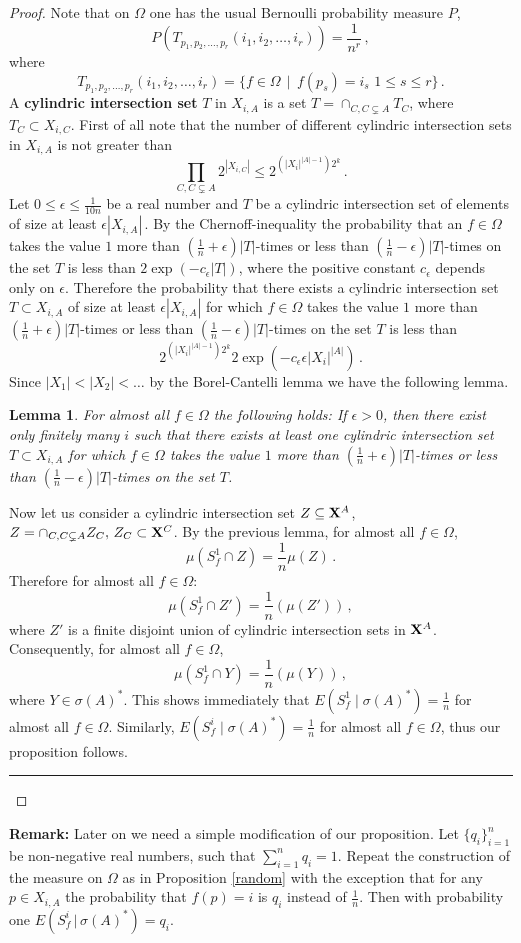 \documentclass [11pt] {article}
\newcommand{\qed} {\hspace {0.1in} \rule {1.5mm} {3.5mm}}
\newtheorem{lemma}{Lemma}[section]
\def\e{\epsilon}
\def\xo{{\bf X}}
\begin{document}
\begin{proof}
\noindent
Note that on $\Omega$ one has the usual Bernoulli probability measure $P$,
$$P(T_{p_1,p_2,\dots,p_r}(i_1,i_2,\dots,i_r))=\frac{1}{n^r}\,,$$
where
$$T_{p_1,p_2,\dots,p_r}(i_1,i_2,\dots,i_r)=\{f\in\Omega\,\mid\, f(p_s)=i_s\,
\,1\leq s \leq r\}\,.$$
A {\bf cylindric intersection set} $T$ in $X_{i,A}$
is a set $T=\cap_{C,C\subsetneq A} T_C$, where  $T_C\subset X_{i,C}$.
First of all note that the number of different cylindric intersection
sets in $X_{i,A}$ is not greater than
$$\prod_{C,C\subsetneq A} 2^{|X_{i,C}|}\leq 2^{(|X_i|^{|A|-1})2^k}\,.$$
Let $0\leq \e \leq\frac{1}{10n}$ be a real number and $T$ be a cylindric
intersection set of elements of size at least $\e |X_{i,A}|\,.$ By the
Chernoff-inequality the probability that an $f\in \Omega$ takes the
value $1$ more than $(\frac{1}{n}+\e)|T|$-times or less than
$(\frac{1}{n}-\e)|T|$-times on the set $T$ is less than
$2\exp(- c_{\e}|T|)$, where the positive constant $c_{\e}$ depends only
on $\e$. Therefore the probability that there exists a cylindric intersection
set $T\subset X_{i,A}$ of size at least $\e |X_{i,A}|$ for which
$f\in \Omega$ takes the
value $1$ more than $(\frac{1}{n}+\e)|T|$-times or less than
$(\frac{1}{n}-\e)|T|$-times on the set $T$ is less than
$$2^{(|X_i|^{|A|-1})2^k} 2 \exp(-c_{\e}\e |X_i|^{|A|})\,.$$
Since $|X_1|<|X_2|<\dots$
 by the Borel-Cantelli lemma we have the following lemma.
\begin{lemma}
For almost all $f\in\Omega$ the following holds: If $\epsilon>0$, then
 there exist only finitely many $i$
such that there exists at least one cylindric intersection set
$T\subset X_{i,A}$ for which $f\in \Omega$ takes the
value $1$ more than $(\frac{1}{n}+\e)|T|$-times or less than
$(\frac{1}{n}-\e)|T|$-times on the set $T$.
\end{lemma}
Now let us consider a cylindric intersection set $Z\subseteq \xo^{A}$,
$Z=\cap_{C,C\subsetneq A} Z_C, \, Z_C\subset \xo^C$.
By the previous lemma, for almost all $f\in \Omega$,
$$\mu(S^1_f\cap Z)=\frac{1}{n}\mu(Z)\,.$$
Therefore for almost all $f\in\Omega$:
$$\mu(S^1_f\cap Z')=\frac{1}{n}(\mu(Z'))\,,$$
where $Z'$ is a finite disjoint union of cylindric intersection sets
in $\xo^{A}$. Consequently, for almost all $f\in\Omega$,
$$\mu(S^1_f\cap Y)=\frac{1}{n}(\mu(Y))\,,$$
where $Y\in \sigma(A)^*$. This shows immediately that
$E(S^1_f\mid \sigma(A)^*)=\frac{1}{n}$ for almost all $f\in\Omega$. Similarly,
$E(S^i_f\mid \sigma(A)^*)=\frac{1}{n}$ for almost all $f\in\Omega$, thus our
proposition follows.
\qed \end{proof} \vskip 0.2in
\noindent
{\bf Remark:} Later on we need a simple modification of our proposition.
Let $\{q_i\}^n_{i=1}$ be non-negative real numbers, such that
$\sum_{i=1}^n q_i=1$. Repeat the construction of the measure on $\Omega$
as in Proposition \ref{random} with the exception that for any $p\in X_{i,A}$
the probability that $f(p)=i$ is $q_i$ instead of $\frac{1}{n}$. Then
with probability one $E(S^i_f\,|\, \sigma (A)^*)=q_i$.
\end{document}
